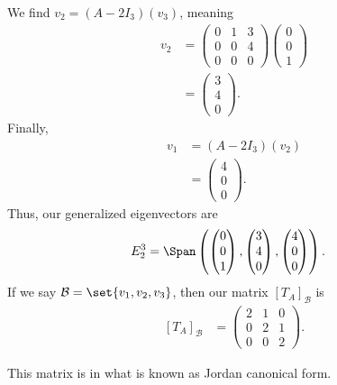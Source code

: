 \documentclass[10pt]{mypackage}
\begin{document}
\begin{example}
  We find $v_2 = \left(A - 2I_3\right)\left(v_3\right)$, meaning
  \begin{align*}
    v_2 &= \begin{pmatrix}0 & 1 & 3 \\ 0 & 0 & 4 \\ 0 & 0 & 0 \end{pmatrix} \begin{pmatrix}0 \\ 0 \\ 1\end{pmatrix}\\
        &= \begin{pmatrix}3\\4\\0\end{pmatrix}.
  \end{align*}
  Finally,
  \begin{align*}
    v_1 &= \left(A - 2I_{3}\right)\left(v_2\right)\\
        &= \begin{pmatrix}4\\0\\0\end{pmatrix}.
  \end{align*}
  Thus, our generalized eigenvectors are
  \begin{align*}
    E_{2}^{3} &= \Span\left( \begin{pmatrix}0\\0\\1\end{pmatrix}, \begin{pmatrix}3\\4\\0\end{pmatrix}, \begin{pmatrix}4\\0\\0\end{pmatrix}\right).
  \end{align*}
  If we say $\mathcal{B} = \set{v_1,v_2,v_3}$, then our matrix $\left[T_{A}\right]_{\mathcal{B}}$ is
  \begin{align*}
    \left[T_{A}\right]_{\mathcal{B}} &= \begin{pmatrix}2 & 1 & 0 \\ 0 & 2 & 1\\ 0 & 0 & 2\end{pmatrix}.
  \end{align*}
  \begin{remark}
    This matrix is in what is known as Jordan canonical form.
  \end{remark}
\end{example}
\end{document}
